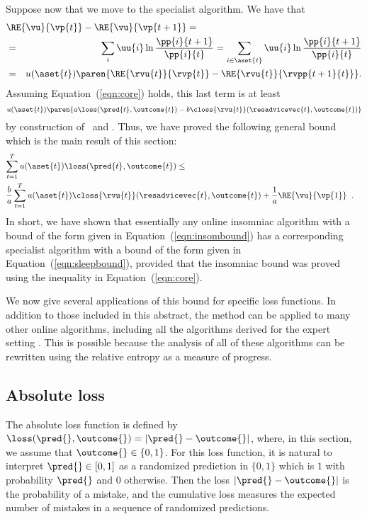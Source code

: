 Suppose now that we move to the specialist algorithm.
We have that
\begin{eqnarray*}
\lefteqn{\RE{\vu}{\vp{t}} - \RE{\vu}{\vp{t+1}} = } \\
& = &   \sum_i \uu{i} \ln\frac{\pp{i}{t+1}}{\pp{i}{t}} 
= \sum_{i\in\aset{t}} \uu{i} \ln\frac{\pp{i}{t+1}}{\pp{i}{t}} \\
&=& u(\aset{t}) \paren{\RE{\rvu{t}}{\rvp{t}} - \RE{\rvu{t}}{\rvpp{t+1}{t}}}.
\end{eqnarray*}
Assuming Equation~(\ref{eqn:core}) holds, this last term is at least
\[
 u(\aset{t}) \paren{a \loss(\pred{t},\outcome{t})
       - b \closs{\rvu{t}}(\resadvicevec{t},\outcome{t})}
\]
by construction of \ and .
Thus, we have proved the following general bound
which is the main result of this section:
\begin{eqnarray} \label{eqn:sleepbound}
  \lefteqn{\sum_{t=1}^T u(\aset{t})\loss(\pred{t},\outcome{t}) \leq} \\
&    \frac{b}{a} \sum_{t=1}^T u(\aset{t})\closs{\rvu{t}}(\resadvicevec{t},\outcome{t})
    + \frac{1}{a} \RE{\vu}{\vp{1}} \;\; . \nonumber
\end{eqnarray}
In short, we have shown that essentially any online insomniac
algorithm with a bound of the form given in Equation~(\ref{eqn:insombound}) has a
corresponding specialist algorithm with a bound of the form given in
Equation~(\ref{eqn:sleepbound}), provided that the insomniac bound was proved using the
inequality in Equation~(\ref{eqn:core}).

We now give several applications of this bound for specific loss
functions. 
In addition to those included in this abstract, the method can be
applied to many other online algorithms,
including all the algorithms derived for the
expert setting \cite{Vovk90,HausslerKiWa95,CesabianchiFrHeHaScWa92}.
This is possible because the analysis of all of these
algorithms can be rewritten using the relative entropy 
as a measure of progress.

\subsection{Absolute loss}

The absolute loss function is defined by
$\loss(\pred{},\outcome{}) = |\pred{} - \outcome{}|$, where, in this
section, we assume that $\outcome{}\in\{0,1\}$.
For this loss function, it is natural to interpret $\pred{}\in[0,1]$
as a randomized prediction in $\{0,1\}$ which is $1$ with probability
$\pred{}$ and $0$ otherwise.
Then the loss $|\pred{} - \outcome{}|$ is the probability of a
mistake, and the cumulative loss measures the expected number of
mistakes in a sequence of randomized predictions.

